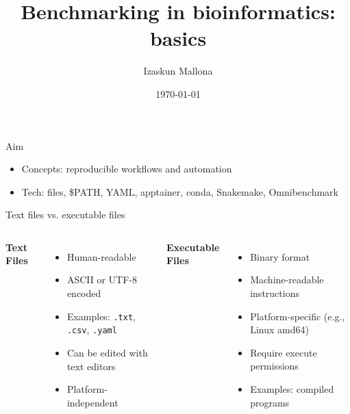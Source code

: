 \documentclass[aspectratio=169]{beamer}
\title{Benchmarking in bioinformatics: basics}
\author{Izaskun Mallona}
\date{\today}
\begin{document}
\frame{\titlepage}




\begin{frame}{Aim}
  \begin{itemize}
  \item Concepts: reproducible workflows and automation
  \item Tech: files, \$PATH, YAML, apptainer, conda, Snakemake, Omnibenchmark
  \end{itemize}
\end{frame}

\begin{frame}{Text files vs. executable files}
    \begin{columns}
        \textbf{Text Files}
        \begin{itemize}
            \item Human-readable
            \item ASCII or UTF-8 encoded
            \item Examples: \texttt{.txt}, \texttt{.csv}, \texttt{.yaml}
            \item Can be edited with text editors
            \item Platform-independent
        \end{itemize}
        
        \textbf{Executable Files}
        \begin{itemize}
            \item Binary format
            \item Machine-readable instructions
            \item Platform-specific (e.g., Linux amd64)
            \item Require execute permissions
            \item Examples: compiled programs
        \end{itemize}
    \end{columns}
\end{frame}
\end{document}
